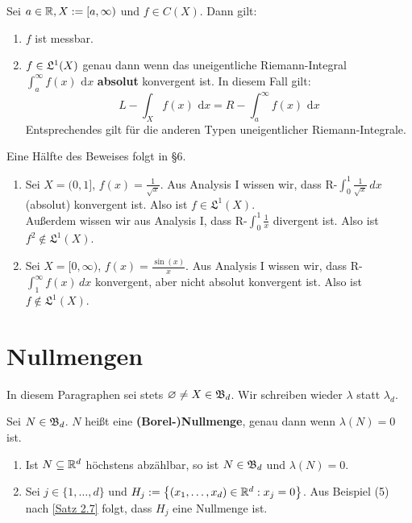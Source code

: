 \documentclass[a4paper,twoside,DIV15,BCOR12mm,chapterprefix=true,headings=onelinechapter]{scrbook}
\begin{document}
\begin{satz}
\label{Satz 4.14}
Sei $a\in\mathbb{R}, X:=[a,\infty)$ und $f\in C(X)$. Dann gilt:
\begin{enumerate}
\item $f$ ist messbar.
\item $f\in\mathfrak{L}^1(X)$ genau dann wenn das uneigentliche Riemann-Integral $\int_a^\infty f(x) \text{ d}x$ \textbf{absolut} konvergent ist. In diesem Fall gilt:
\[L-\int_X f(x) \text{ d}x=R-\int_a^\infty f(x) \text{ d}x\]
Entsprechendes gilt für die anderen Typen uneigentlicher Riemann-Integrale.
\end{enumerate}
\end{satz}

\begin{beweis}
Eine Hälfte des Beweises folgt in §6.
\end{beweis}

\begin{beispiel}
\begin{enumerate}
\item Sei $X=(0,1]$, $f(x)=\frac{1}{\sqrt{x}}$. Aus Analysis I wissen wir, dass R-$\int^1_0\frac{1}{\sqrt{x}}\,dx$ (absolut) konvergent ist. Also ist $f\in\mathfrak{L}^1(X)$.\\
Außerdem wissen wir aus Analysis I, dass R-$\int_0^1\frac{1}{x}$ divergent ist. Also ist $f^2\notin\mathfrak{L}^1(X)$.
\item Sei $X=[0,\infty)$, $f(x)=\frac{\sin(x)}{x}$. Aus Analysis I wissen wir, dass R-$\int^{\infty}_1f(x)\,dx$ konvergent, aber nicht absolut konvergent ist. Also ist $f\notin\mathfrak{L}^1(X)$.
\end{enumerate}
\end{beispiel}

\chapter{Nullmengen}
In diesem Paragraphen sei stets $\varnothing\ne X\in\mathfrak{B}_d$. Wir schreiben wieder $\lambda$ statt $\lambda_d$.

\begin{definition}
Sei $N\in\mathfrak{B}_d$. $N$ heißt eine \textbf{(Borel-)Nullmenge}, genau dann wenn $\lambda(N)=0$ ist.
\end{definition}

\begin{beispiel}
\begin{enumerate}
\item Ist $N\subseteq\mathbb{R}^d$ höchstens abzählbar, so ist $N\in\mathfrak{B}_d$ und $\lambda(N)=0$.
\item Sei $j\in\{1,\dots,d\}$ und $H_j:=\left\{(x_1,\dots,x_d) \in\mathbb{R}^d : x_j=0 \right\}$. Aus Beispiel (5) nach \ref{Satz 2.7} folgt, dass $H_j$ eine Nullmenge ist.
\end{enumerate}
\end{beispiel}
\end{document}
